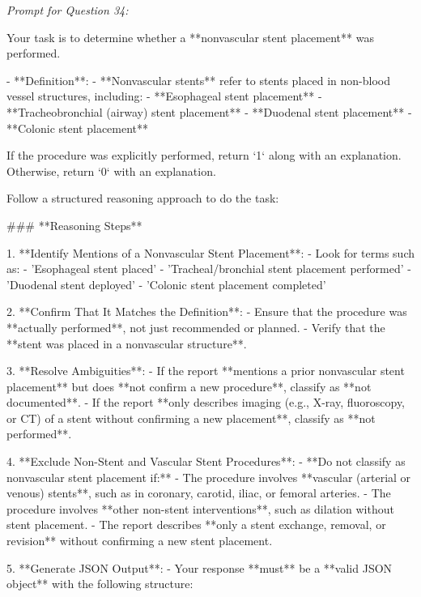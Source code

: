 \textit{\normalsize Prompt for Question  34:}
\begin{mdframed}[]
\normalsize

Your task is to determine whether a **nonvascular stent placement** was performed.  

- **Definition**:  
  - **Nonvascular stents** refer to stents placed in non-blood vessel structures, including:  
    - **Esophageal stent placement**  
    - **Tracheobronchial (airway) stent placement**  
    - **Duodenal stent placement**  
    - **Colonic stent placement**  

If the procedure was explicitly performed, return `1` along with an explanation. Otherwise, return `0` with an explanation.

Follow a structured reasoning approach to do the task:

### **Reasoning Steps**  

1. **Identify Mentions of a Nonvascular Stent Placement**:  
   - Look for terms such as:  
     - 'Esophageal stent placed'  
     - 'Tracheal/bronchial stent placement performed'  
     - 'Duodenal stent deployed'  
     - 'Colonic stent placement completed'  

2. **Confirm That It Matches the Definition**:  
   - Ensure that the procedure was **actually performed**, not just recommended or planned.  
   - Verify that the **stent was placed in a nonvascular structure**.  

3. **Resolve Ambiguities**:  
   - If the report **mentions a prior nonvascular stent placement** but does **not confirm a new procedure**, classify as **not documented**.  
   - If the report **only describes imaging (e.g., X-ray, fluoroscopy, or CT) of a stent without confirming a new placement**, classify as **not performed**.  

4. **Exclude Non-Stent and Vascular Stent Procedures**:  
   - **Do not classify as nonvascular stent placement if:**  
     - The procedure involves **vascular (arterial or venous) stents**, such as in coronary, carotid, iliac, or femoral arteries.  
     - The procedure involves **other non-stent interventions**, such as dilation without stent placement.  
     - The report describes **only a stent exchange, removal, or revision** without confirming a new stent placement.  

5. **Generate JSON Output**:  
   - Your response **must** be a **valid JSON object** with the following structure:  

\end{mdframed}

